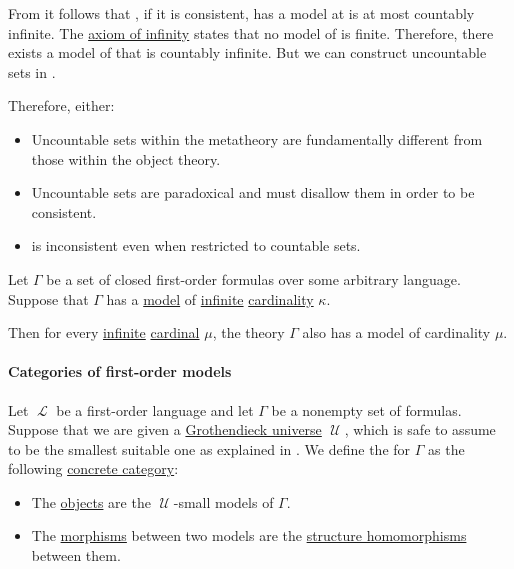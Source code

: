 \begin{example}\label{ex:skolems_paradox}
  From  it follows that \hyperref[def:zfc]{}, if it is consistent, has a model at is at most countably infinite. The \hyperref[def:zfc/infinity]{axiom of infinity} states that no model of  is finite. Therefore, there exists a model of  that is countably infinite. But we can construct uncountable sets in .

  Therefore, either:
  \begin{itemize}
    \item Uncountable sets within the metatheory are fundamentally different from those within the object theory.
    \item Uncountable sets are paradoxical and  must disallow them in order to be consistent.
    \item {} is inconsistent even when restricted to countable sets.
  \end{itemize}
\end{example}

\begin{theorem}\label{thm:upward_lowenheim_skolem_theorem}
  Let \( \Gamma \) be a set of closed first-order formulas over some arbitrary language. Suppose that \( \Gamma \) has a \hyperref[def:first_order_model]{model} of \hyperref[def:set_finiteness]{infinite} \hyperref[thm:cardinality_existence]{cardinality} \( \kappa \).

  Then for every \hyperref[def:set_finiteness]{infinite} \hyperref[def:cardinal]{cardinal} \( \mu \), the theory \( \Gamma \) also has a model of cardinality \( \mu \).
\end{theorem}

\paragraph{Categories of first-order models}

\begin{definition}\label{def:category_of_small_first_order_models}\mimprovised
  Let \( \mscrL \) be a first-order language and let \( \Gamma \) be a nonempty set of formulas. Suppose that we are given a \hyperref[def:grothendieck_universe]{Grothendieck universe} \( \mscrU \), which is safe to assume to be the smallest suitable one as explained in . We define the  for \( \Gamma \) as the following \hyperref[rem:concrete_categories]{concrete category}:

  \begin{itemize}
    \item The \hyperref[def:category/objects]{objects} are the \( \mscrU \)-small models of \( \Gamma \).

    \item The \hyperref[def:category/morphisms]{morphisms} between two models are the \hyperref[def:first_order_homomorphism]{structure homomorphisms} between them.
  \end{itemize}
\end{definition}

